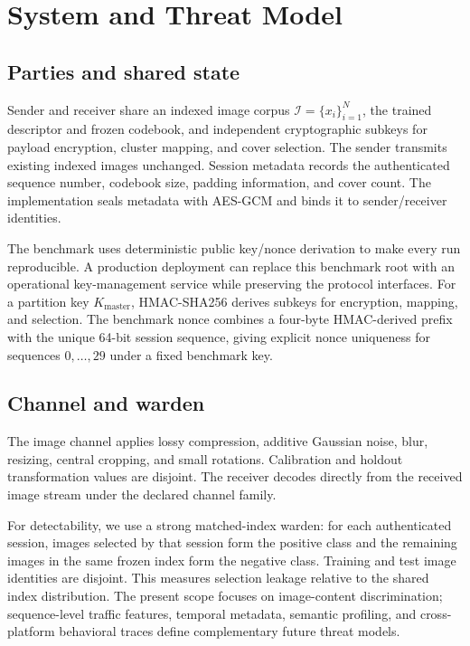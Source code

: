 \section{System and Threat Model}
\label{sec:threat}

\subsection{Parties and shared state}

Sender and receiver share an indexed image corpus $\mathcal{I}=\{x_i\}_{i=1}^{N}$, the trained descriptor and frozen codebook, and independent cryptographic subkeys for payload encryption, cluster mapping, and cover selection. The sender transmits existing indexed images unchanged. Session metadata records the authenticated sequence number, codebook size, padding information, and cover count. The implementation seals metadata with AES-GCM and binds it to sender/receiver identities.

The benchmark uses deterministic public key/nonce derivation to make every run reproducible. A production deployment can replace this benchmark root with an operational key-management service while preserving the protocol interfaces. For a partition key $K_{\mathrm{master}}$, HMAC-SHA256 derives subkeys for encryption, mapping, and selection. The benchmark nonce combines a four-byte HMAC-derived prefix with the unique 64-bit session sequence, giving explicit nonce uniqueness for sequences $0,\ldots,29$ under a fixed benchmark key.

\subsection{Channel and warden}

The image channel applies lossy compression, additive Gaussian noise, blur, resizing, central cropping, and small rotations. Calibration and holdout transformation values are disjoint. The receiver decodes directly from the received image stream under the declared channel family.

For detectability, we use a strong matched-index warden: for each authenticated session, images selected by that session form the positive class and the remaining images in the same frozen index form the negative class. Training and test image identities are disjoint. This measures selection leakage relative to the shared index distribution. The present scope focuses on image-content discrimination; sequence-level traffic features, temporal metadata, semantic profiling, and cross-platform behavioral traces define complementary future threat models.

